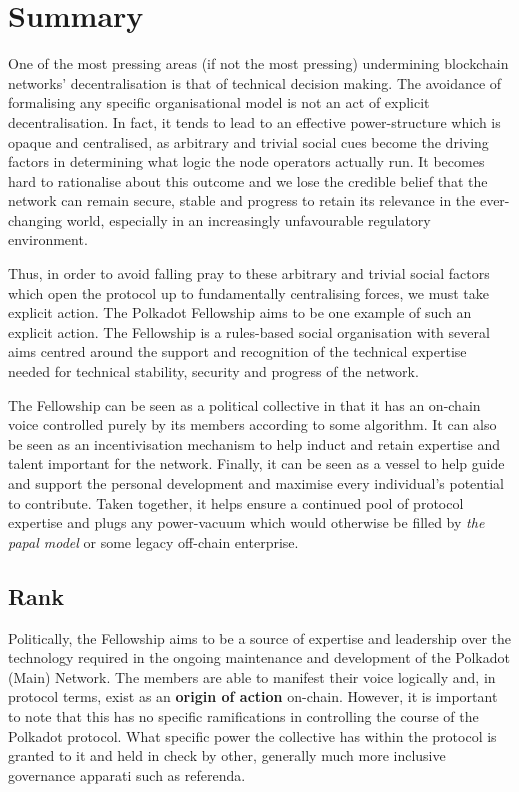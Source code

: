 \documentclass[9pt,oneside]{amsart}
\begin{document}
\section{Summary}\label{summary}

One of the most pressing areas (if not the most pressing) undermining blockchain networks' decentralisation is that of technical decision making. The avoidance of formalising any specific organisational model is not an act of explicit decentralisation. In fact, it tends to lead to an effective power-structure which is opaque and centralised, as arbitrary and trivial social cues become the driving factors in determining what logic the node operators actually run. It becomes hard to rationalise about this outcome and we lose the credible belief that the network can remain secure, stable and progress to retain its relevance in the ever-changing world, especially in an increasingly unfavourable regulatory environment.

Thus, in order to avoid falling pray to these arbitrary and trivial social factors which open the protocol up to fundamentally centralising forces, we must take explicit action. The Polkadot Fellowship aims to be one example of such an explicit action. The Fellowship is a rules-based social organisation with several aims centred around the support and recognition of the technical expertise needed for technical stability, security and progress of the network.

The Fellowship can be seen as a political collective in that it has an on-chain voice controlled purely by its members according to some algorithm. It can also be seen as an incentivisation mechanism to help induct and retain expertise and talent important for the network. Finally, it can be seen as a vessel to help guide and support the personal development and maximise every individual's potential to contribute. Taken together, it helps ensure a continued pool of protocol expertise and plugs any power-vacuum which would otherwise be filled by \emph{the papal model} or some legacy off-chain enterprise.


\subsection{Rank}

Politically, the Fellowship aims to be a source of expertise and leadership over the technology required in the ongoing maintenance and development of the Polkadot (Main) Network. The members are able to manifest their voice logically and, in protocol terms, exist as an \textbf{origin of action} on-chain. However, it is important to note that this has no specific ramifications in controlling the course of the Polkadot protocol. What specific power the collective has within the protocol is granted to it and held in check by other, generally much more inclusive governance apparati such as referenda.
\end{document}
